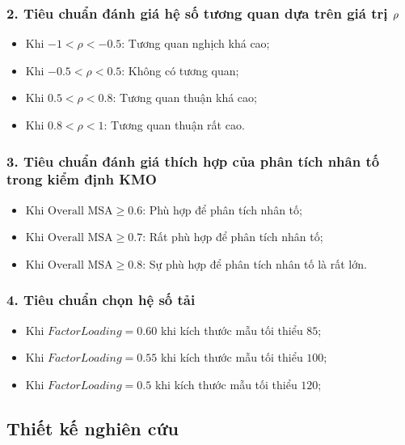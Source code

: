 \documentclass[../thesis.tex]{subfiles}
\begin{document}
\subsubsection{2. Tiêu chuẩn đánh giá hệ số tương quan dựa trên giá trị $ \bf\rho $}
\begin{itemize}
	\item Khi $ -1 < \rho < -0.5 $: Tương quan nghịch khá cao; 
	\item Khi $ -0.5 < \rho < 0.5 $: Không có tương quan; 
	\item Khi $ 0.5 < \rho < 0.8 $: Tương quan thuận khá cao; 
	\item Khi $ 0.8 < \rho < 1 $: Tương quan thuận rất cao.
\end{itemize}

\subsubsection{3. Tiêu chuẩn đánh giá thích hợp của phân tích nhân tố trong kiểm định KMO}
\begin{itemize}
	\item Khi $ \text{Overall MSA} \geq 0.6 $: Phù hợp để phân tích nhân tố; 
	\item Khi $ \text{Overall MSA} \geq 0.7 $: Rất phù hợp để phân tích nhân tố; 
	\item Khi $ \text{Overall MSA} \geq 0.8 $: Sự phù hợp để phân tích nhân tố là rất lớn.
\end{itemize}

\subsubsection{4. Tiêu chuẩn chọn hệ số tải}
\begin{itemize}
	\item Khi $ Factor Loading =  0.60 $ khi kích thước mẫu tối thiểu $ 85 $; 
	\item Khi $ Factor Loading =  0.55 $ khi kích thước mẫu tối thiểu $ 100 $;  
	\item Khi $ Factor Loading =  0.5 $ khi kích thước mẫu tối thiểu $ 120 $; 
\end{itemize}

\newpage
\subsection{Thiết kế nghiên cứu}
\end{document}
